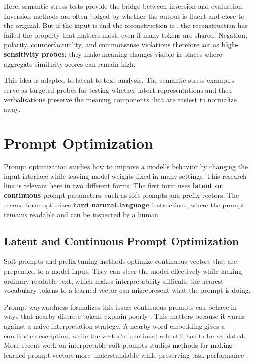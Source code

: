 \documentclass[12pt,a4paper,twoside,openright]{book}
\begin{document}
Here, semantic stress tests provide the bridge between inversion and
evaluation. Inversion methods are often judged by whether the output is fluent
and close to the original. But if the input is  and the reconstruction is , the reconstruction has failed the property that matters most,
even if many tokens are shared. Negation, polarity, counterfactuality, and
commonsense violations therefore act as \textbf{high-sensitivity probes}: they
make meaning changes visible in places where aggregate similarity scores can
remain high.

This idea is adapted to latent-to-text analysis. The semantic-stress examples
serve as targeted probes for testing whether latent representations and their
verbalizations preserve the meaning components that are easiest to normalize
away.

\section{Prompt Optimization}
\label{sec:related-prompt-optimization}

Prompt optimization studies how to improve a model's behavior by changing the
input interface while leaving model weights fixed in many settings. This
research line is relevant here in two different forms. The first form
uses \textbf{latent or continuous} prompt parameters, such as soft prompts and
prefix vectors. The second form optimizes \textbf{hard natural-language}
instructions, where the prompt remains readable and can be inspected by a human.

\subsection{Latent and Continuous Prompt Optimization}
\label{sec:related-soft-prompts}

Soft prompts and prefix-tuning methods optimize continuous vectors that are
prepended to a model input. They can steer the model effectively while lacking
ordinary readable text, which makes interpretability difficult: the nearest
vocabulary tokens to a learned vector can misrepresent what the prompt is doing.

Prompt waywardness formalizes this issue: continuous prompts can behave in ways
that nearby discrete tokens explain poorly
\cite{DBLP:conf/naacl/KhashabiLMQ0WHK22}. This matters because it warns against a
naive interpretation strategy. A nearby word embedding gives a candidate
description, while the vector's functional role still has to be validated.
More recent work on interpretable soft prompts studies methods for making
learned prompt vectors more understandable while preserving task performance
\cite{DBLP:journals/corr/abs-2504-02144}.
\end{document}
